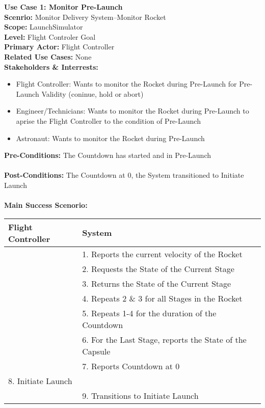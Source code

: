\documentclass[letterpaper]{article}
\begin{document}
\noindent
\textbf{Use Case 1: Monitor Pre-Launch}\\
\textbf{Scenrio:  }Monitor Delivery System--Monitor Rocket\\
\textbf{Scope:  }LaunchSimulator\\
\textbf{Level:  }Flight Controler Goal\\
\textbf{Primary Actor:  }Flight Controller\\
\textbf{Related Use Cases:  }None\\
\textbf{Stakeholders \& Interrests:  }
\begin{itemize}
\item Flight Controller:  Wants to monitor the Rocket during
Pre-Launch for Pre-Launch Validity (coninue, hold or abort)
\item Engineer/Technicians:  Wants to monitor the Rocket during
Pre-Launch to aprise the Flight Controller to the condition of
Pre-Launch
\item Astronaut:  Wants to monitor the Rocket during Pre-Launch 
\end{itemize}
\textbf{Pre-Conditions:  }The Countdown has started and in
Pre-Launch\\\\
\textbf{Post-Conditions:  }The Countdown at 0, the System transitioned
to Initiate Launch\\\\
\textbf{Main Success Scenorio: }\\
\begin{tabular}{|p{5.75cm}|p{5.75cm}|}\hline
\textbf{Flight Controller} & \textbf{System}\\\hline
& 1.  Reports the current velocity of the Rocket\\\hline
& 2.  Requests the State of the Current Stage\\\hline
& 3.  Returns the State of the Current Stage\\\hline
& 4.  Repeats 2 \& 3 for all Stages in the Rocket\\\hline
& 5.  Repeats 1-4 for the duration of the Countdown\\\hline
& 6.  For the Last Stage, reports the State of the Capsule\\\hline
& 7.  Reports Countdown at 0\\\hline
8.  Initiate Launch &\\\hline
& 9.  Transitions to Initiate Launch\\\hline
\end{tabular}\\\\
\end{document}
